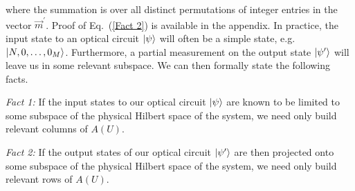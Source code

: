 \documentclass[aps,pra,twocolumn,showpacs,superscriptaddress,floatfix,10pt]{revtex4}
\begin{document}
where the summation is over all distinct permutations of integer entries in the vector $\vec{m}^\prime$. Proof of Eq.~(\ref{Fact 2}) is available in the appendix.
\newline
\newline
\indent In practice, the input state to an optical circuit $\ket{\psi}$ will often be a simple state, e.g. $\ket{N,0,\dots,0_M}$. Furthermore, a partial measurement on the output state $\ket{\psi^\prime}$ will leave us in some relevant subspace. We can then formally state the following facts.
\newline

\textit{Fact 1:} If the input states to our optical circuit $\ket{\psi}$ are known to be limited to some subspace of the physical Hilbert space of the system, we need only build relevant columns of $A(U)$.
\newline

\textit{Fact 2:} If the output states of our optical circuit $\ket{\psi^\prime}$ are then projected onto some subspace of the physical Hilbert space of the system, we need only build relevant rows of $A(U)$.
\newline
 
\end{document}

